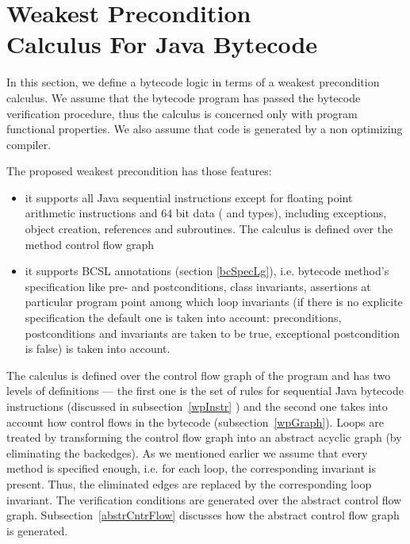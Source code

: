 
\section{Weakest Precondition \\Calculus For Java Bytecode}\label{wpbc}
In this section, we define a bytecode logic in terms of a weakest precondition calculus.
We assume that the bytecode program has passed the bytecode verification procedure,
 thus the calculus is concerned only with program functional properties. We also assume that code is generated by a non optimizing compiler. 

The proposed weakest precondition has those features:
\begin{itemize}
\item it supports all Java sequential instructions except for floating point arithmetic instructions and 64 bit data ( and  types), including 
exceptions, object creation, references and subroutines. The calculus is defined over the method control flow graph

\item it supports BCSL annotations (section \ref{bcSpecLg}), i.e. bytecode method's specification like pre- and postconditions, class invariants, assertions at particular program point among 
which loop invariants (if there is no explicite specification  the default one is taken into account: preconditions, postconditions and invariants are taken to be true, exceptional postcondition is false) is taken into account. %
\end{itemize}

The calculus is defined over the control flow graph of the program and has two levels of definitions --- the first one is the set of rules for sequential Java bytecode instructions (discussed in subsection~\ref{wpInstr} ) and the second one takes into account how control
 flows in the bytecode (subsection~\ref{wpGraph}).
Loops are treated by transforming the control flow graph into an abstract acyclic graph (by eliminating the backedges). As we mentioned earlier we assume that every method is specified enough, i.e. for each loop, the corresponding invariant is present. Thus, the eliminated edges are replaced by the corresponding loop invariant. 
 The verification conditions are generated over the abstract control flow graph. Subsection~\ref{abstrCntrFlow} discusses 
how the abstract control flow graph is generated.

